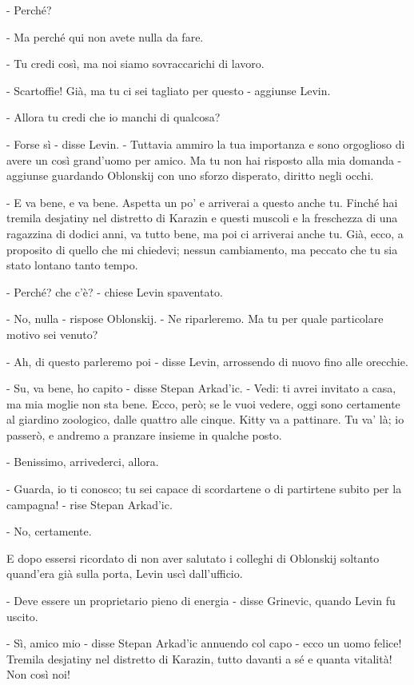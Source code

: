 - Perché? 

- Ma perché qui non avete nulla da fare. 

- Tu credi così, ma noi siamo sovraccarichi di lavoro. 

- Scartoffie! Già, ma tu ci sei tagliato per questo - aggiunse Levin. 

- Allora tu credi che io manchi di qualcosa? 

- Forse sì - disse Levin. - Tuttavia ammiro la tua importanza e sono orgoglioso di avere un così grand'uomo per amico. Ma tu non hai risposto alla mia domanda - aggiunse guardando Oblonskij con uno sforzo disperato, diritto negli occhi. 

- E va bene, e va bene. Aspetta un po' e arriverai a questo anche tu. Finché hai tremila desjatiny nel distretto di Karazin e questi muscoli e la freschezza di una ragazzina di dodici anni, va tutto bene, ma poi ci arriverai anche tu. Già, ecco, a proposito di quello che mi chiedevi; nessun cambiamento, ma peccato che tu sia stato lontano tanto tempo. 

- Perché? che c'è? - chiese Levin spaventato. 

- No, nulla - rispose Oblonskij. - Ne riparleremo. Ma tu per quale particolare motivo sei venuto? 

- Ah, di questo parleremo poi - disse Levin, arrossendo di nuovo fino alle orecchie. 

- Su, va bene, ho capito - disse Stepan Arkad'ic. - Vedi: ti avrei invitato a casa, ma mia moglie non sta bene. Ecco, però; se le vuoi vedere, oggi sono certamente al giardino zoologico, dalle quattro alle cinque. Kitty va a pattinare. Tu va' là; io passerò, e andremo a pranzare insieme in qualche posto. 

- Benissimo, arrivederci, allora. 

- Guarda, io ti conosco; tu sei capace di scordartene o di partirtene subito per la campagna! - rise Stepan Arkad'ic. 

- No, certamente. 

E dopo essersi ricordato di non aver salutato i colleghi di Oblonskij soltanto quand'era già sulla porta, Levin uscì dall'ufficio. 

- Deve essere un proprietario pieno di energia - disse Grinevic, quando Levin fu uscito. 

- Sì, amico mio - disse Stepan Arkad'ic annuendo col capo - ecco un uomo felice! Tremila desjatiny nel distretto di Karazin, tutto davanti a sé e quanta vitalità! Non così noi! 


